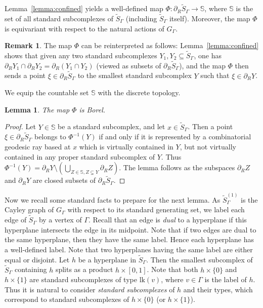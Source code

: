 \documentclass[JEP,XML,SOM,Unicode,NoFloatCountersInSection,published]{cedram}
\theoremstyle{plain}
\newtheorem{lemma}[theo]{Lemma}
\theoremstyle{definition}
\newtheorem{rk}[theo]{Remark}
\newcommand{\lk}{\mathrm{lk}}
\begin{document}
Lemma~\ref{lemma:confined} yields a well-defined map $\Phi:\partial_R \widetilde{S}_\Gamma\to \mathbb{S}$, where $\mathbb{S}$ is the set of all standard subcomplexes of $\widetilde{S}_\Gamma$ (including $\widetilde{S}_\Gamma$ itself). Moreover, the map $\Phi$ is equivariant with respect to the natural actions of $G_\Gamma$.

\begin{rk}
The map $\Phi$ can be reinterpreted as follows: Lemma~\ref{lemma:confined} shows that given any two standard subcomplexes $Y_1,Y_2\subseteq\widetilde{S}_\Gamma$, one has $\partial_R Y_1\cap\partial_R Y_2=\partial_R(Y_1\cap Y_2)$ (viewed as subsets of $\partial_R\widetilde{S}_\Gamma$), and the map $\Phi$ then sends a point $\xi\in\partial_R\widetilde{S}_\Gamma$ to the smallest standard subcomplex $Y$ such that $\xi\in\partial_RY$.
\end{rk}

We equip the countable set $\mathbb{S}$ with the discrete topology.

\begin{lemma}
\label{lem:borel}
The map $\Phi$ is Borel.
\end{lemma}

\begin{proof}
Let $Y\in \mathbb {S}$ be a standard subcomplex, and let $x\in \widetilde{S}_\Gamma$. Then a point $\xi\in\partial_R\widetilde{S}_\Gamma$ belongs to $\Phi^{-1}(Y)$ if and only if it is represented by a combinatorial geodesic ray based at $x$ which is virtually contained in $Y$, but not virtually contained in any proper standard subcomplex of $Y$. Thus $\Phi^{-1}(Y)=\partial_R Y\setminus(\bigcup_{Z\in \mathbb {S}, Z\subsetneq Y}\partial_R Z)$. The lemma follows as the subspaces $\partial_R Z$ and $\partial_R Y$ are closed subsets of $\partial_R \widetilde{S}_\Gamma$.
\end{proof}

Now we recall some standard facts to prepare for the next lemma. As $\widetilde{S}^{(1)}_\Gamma$ is the Cayley graph of $G_\Gamma$ with respect to its standard generating set, we label each edge of $\widetilde{S}_\Gamma$ by a vertex of $\Gamma$. Recall that an edge is \emph{dual} to a hyperplane if this hyperplane intersects the edge in its midpoint. Note that if two edges are dual to the same hyperplane, then they have the same label. Hence each hyperplane has a well-defined label. Note that two hyperplanes having the same label are either equal or disjoint. Let $h$ be a hyperplane in $\widetilde{S}_\Gamma$. Then the smallest subcomplex of $\widetilde{S}_\Gamma$ containing $h$ splits as a product $h\times [0,1]$. Note that both $h\times\{0\}$ and $h\times\{1\}$ are standard subcomplexes of type $\lk(v)$, where $v\in \Gamma$ is the label of $h$. Thus it is natural to consider \emph{standard subcomplexes} of $h$ and their types, which correspond to standard subcomplexes of $h\times\{0\}$ (or $h\times\{1\}$).
\end{document}
